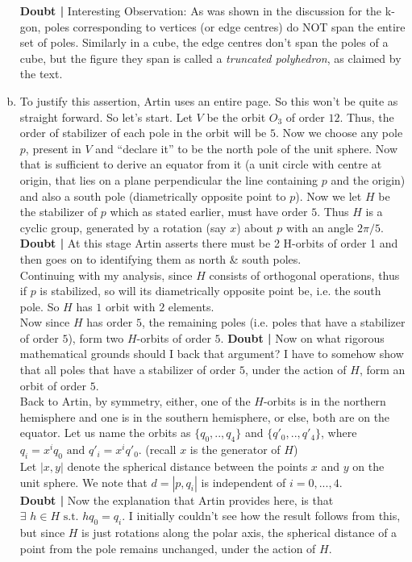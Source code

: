 \documentclass[12pt]{article}
\begin{document}
\begin{enumerate}[(a)]
\par
{\bf Doubt | }Interesting Observation: As was shown in the discussion for the k-gon, poles corresponding to vertices (or edge centres) do NOT span the entire set of poles. Similarly in a cube, the edge centres don't span the poles of a cube, but the figure they span is called a \emph{truncated polyhedron}, as claimed by the text.
\item
To justify this assertion, Artin uses an entire page. So this won't be quite as straight forward. So let's start. Let $V$ be the orbit $O_{3}$ of order $12$. Thus, the order of stabilizer of each pole in the orbit will be $5$. Now we choose any pole $p$, present in $V$ and ``declare it'' to be the north pole of the unit sphere. Now that is sufficient to derive an equator from it (a unit circle with centre at origin, that lies on a plane perpendicular the line containing $p$ and the origin) and also a south pole (diametrically opposite point to $p$). Now we let $H$ be the stabilizer of $p$ which as stated earlier, must have order $5$. Thus $H$ is a cyclic group, generated by a rotation (say $x$) about $p$ with an angle $2\pi/5$. {\bf Doubt | } At this stage Artin asserts there must be 2 H-orbits of order 1 and then goes on to identifying them as north \& south poles.\\
Continuing with my analysis, since $H$ consists of orthogonal operations, thus if $p$ is stabilized, so will its diametrically opposite point be, i.e. the south pole. So $H$ has $1$ orbit with $2$ elements.\\
Now since $H$ has order $5$, the remaining poles (i.e. poles that have a stabilizer of order $5$), form two $H$-orbits of order $5$.
{\bf Doubt | }Now on what rigorous mathematical grounds should I back that argument? I have to somehow show that all poles that have a stabilizer of order $5$, under the action of $H$, form an orbit of order $5$.\\
Back to Artin, by symmetry, either, one of the $H$-orbits is in the northern hemisphere and one is in the southern hemisphere, or else, both are on the equator. Let us name the orbits as $\{q_{0},..,q_{4}\}$ and $\{q'_{0},..,q'_{4}\}$, where $q_{i}=x^{i}q_{0} \text{ and } q'_{i}=x^{i}q'_{0}$. (recall $x$ is the generator of $H$)\\Let $|x,y|$ denote the spherical distance between the points $x$ and $y$ on the unit sphere. We note that $d=|p,q_{i}|$ is independent of $i=0,...,4$.\\
{\bf Doubt | } Now the explanation that Artin provides here, is that $\exists\,\,h \in H \text { s.t. } hq_{0}=q_{i}$. I initially couldn't see how the result follows from this, but since $H$ is just rotations along the polar axis, the spherical distance of a point from the pole remains unchanged, under the action of $H$.\\

\end{enumerate}
\end{document}

